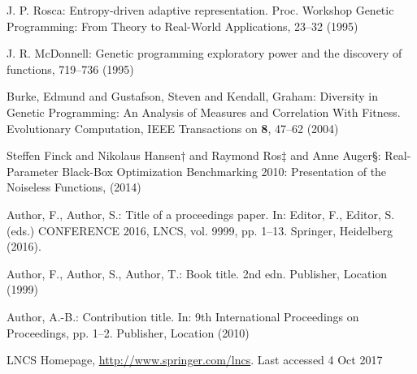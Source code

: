 \documentclass[runningheads]{llncs}
\begin{document}
%
%
%
% 
% 
%
\begin{thebibliography}{8}
J. P. Rosca: Entropy-driven adaptive representation. Proc. Workshop Genetic Programming: From Theory to Real-World Applications, 23--32 (1995)

J. R. McDonnell: Genetic programming exploratory power and the discovery of functions, 719--736 (1995)

Burke, Edmund and Gustafson, Steven and Kendall, Graham: Diversity in Genetic Programming: An Analysis of Measures and Correlation With Fitness. Evolutionary Computation, IEEE Transactions on \textbf{8}, 47--62 (2004)

Steffen Finck and Nikolaus Hansen† and Raymond Ros‡ and Anne Auger§: Real-Parameter Black-Box Optimization Benchmarking 2010: Presentation of the Noiseless Functions, (2014)

Author, F., Author, S.: Title of a proceedings paper. In: Editor,
F., Editor, S. (eds.) CONFERENCE 2016, LNCS, vol. 9999, pp. 1--13.
Springer, Heidelberg (2016). 

Author, F., Author, S., Author, T.: Book title. 2nd edn. Publisher,
Location (1999)

Author, A.-B.: Contribution title. In: 9th International Proceedings
on Proceedings, pp. 1--2. Publisher, Location (2010)

LNCS Homepage, \url{http://www.springer.com/lncs}. Last accessed 4
Oct 2017
\end{thebibliography}
\end{document}
